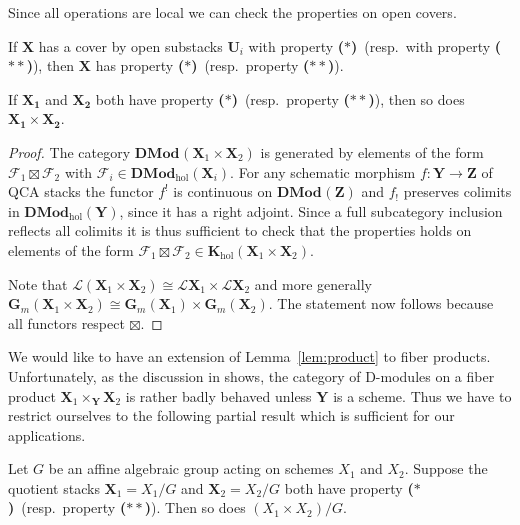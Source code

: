 \documentclass{oupau}
\theoremstyle{remark}
\let\stack\mathbf                           %
\newcommand\cat{\mathbf}                    %
\newcommand\sheaf\mathcal
\newcommand\catDMod[2][]{\cat{DMod}_{#1}(#2)}   %
\newcommand\catDModHol[1]{\catDMod[\mathrm{hol}]{#1}}   %
\newcommand\bc{\textbf{($\mathbf{*}$)}}
\newcommand\hbc{\textbf{($\mathbf{**}$)}}
\newcommand\catK[2][]{\cat{K}_{#1}(#2)}
\newcommand\catKHol[1]{\catK[\mathrm{hol}]{#1}}
\newcommand\ls[1]{\mathcal{L} #1}
\begin{document}
Since all operations are local we can check the properties on open covers.

\begin{lemma}\label{lem:open_cover}
    If $\stack X$ has a cover by open substacks $\stack U_i$ with property \bc\ (resp.~with property \hbc), then $\stack X$ has property \bc\ (resp.~property \hbc).
\end{lemma}

\begin{lemma}\label{lem:product}
    If $\stack{X_1}$ and $\stack{X_2}$ both have property \bc\ (resp.~property \hbc), then so does $\stack{X_1} \times \stack{X_2}$.
\end{lemma}

\begin{proof}
    The category $\catDMod{\stack X_1 \times \stack X_2}$ is generated by elements of the form $\sheaf F_1 \boxtimes \sheaf F_2$ with $\sheaf F_i \in \catDModHol{\stack X_i}$.
    For any schematic morphism $f\colon \stack Y \to \stack Z$ of QCA stacks the functor $f^!$ is continuous on $\catDMod{\stack Z}$ and $f_!$ preserves colimits in $\catDModHol{\stack Y}$, since it has a right adjoint.
    Since a full subcategory inclusion reflects all colimits it is thus sufficient to check that the properties holds on elements of the form $\sheaf F_1 \boxtimes \sheaf F_2 \in \catKHol{\stack X_1 \times \stack X_2}$.
    
    Note that $\ls(\stack X_1 \times \stack X_2) \cong \ls \stack X_1 \times \ls \stack X_2$ and more generally $\stack G_m(\stack X_1 \times \stack X_2) \cong \stack G_m(\stack X_1) \times \stack G_m(\stack X_2)$.
    The statement now follows because all functors respect $\boxtimes$.
\end{proof}

We would like to have an extension of Lemma~\ref{lem:product} to fiber products.
Unfortunately, as the discussion in \cite[Section~1.2]{BenZviNadler:arXiv:CharacterTheoryOfAComplexGroup} shows, the category of D-modules on a fiber product $\stack X_1 \times_{\stack Y} \stack X_2$ is rather badly behaved unless $\stack Y$ is a scheme.
Thus we have to restrict ourselves to the following partial result which is sufficient for our applications.

\begin{lemma}\label{lem:product_quotient}
  Let $G$ be an affine algebraic group acting on schemes $X_1$ and $X_2$.
  Suppose the quotient stacks $\stack X_1 = X_1/G$ and $\stack X_2 = X_2/G$ both have property \bc\ (resp.~property \hbc).
  Then so does $(X_1 \times X_2)/G$.
\end{lemma}
\end{document}

